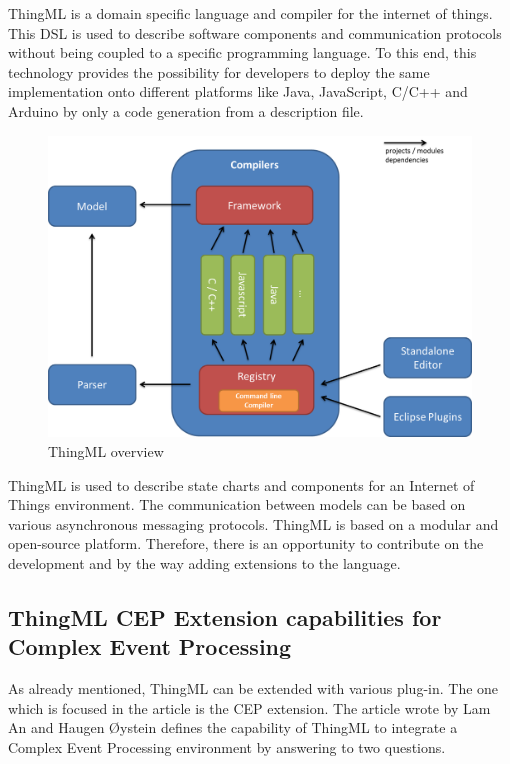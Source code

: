 \documentclass{article}
\begin{document}
ThingML is a domain specific language and compiler for the internet of things. This DSL is used to describe software components and communication protocols without being coupled to a specific programming language. To this end, this technology provides the possibility for developers to deploy the same implementation onto different platforms like Java, JavaScript, C/C++ and Arduino by only a code generation from a description file.

\begin{figure}[h!]
	\includegraphics[width=\linewidth]{dsl.png}
	\caption{ThingML overview}
  	\label{fig:thingml} 
\end{figure}

ThingML is used to describe state charts and components for an Internet of Things environment. The communication between models can be based on various asynchronous messaging protocols. ThingML is based on a modular and open-source platform. Therefore, there is an opportunity to contribute on the development and by the way adding extensions to the language.

\subsection{ThingML CEP Extension capabilities for Complex Event Processing}

As already mentioned, ThingML can be extended with various plug-in. The one which is focused in the article is the CEP extension. The article wrote by Lam An and Haugen Øystein defines the capability of ThingML to integrate a Complex Event Processing environment by answering to two questions.
\end{document}
